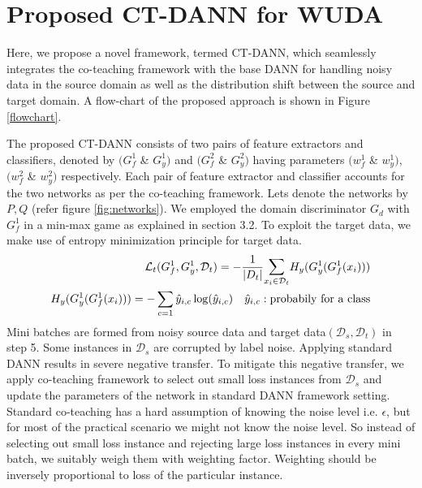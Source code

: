 
\section{Proposed CT-DANN for WUDA}
Here, we propose a novel framework, termed CT-DANN, which seamlessly integrates the co-teaching framework with the base DANN for handling noisy data in the source domain as well as the distribution shift between the source and target domain.
A flow-chart of the proposed approach is shown in Figure \ref{flowchart}.

\vspace{-1cm}

The proposed CT-DANN consists of two pairs of feature extractors and classifiers, denoted by $(G_{f}^1$ \& $G_{y}^1)$ and $(G_{f}^2$ \& $G_{y}^2)$ having parameters $(w_{f}^1$ \& $w_{y}^1)$, $(w_{f}^2$ \& $w_{y}^2)$ respectively. 
Each pair of feature extractor and classifier accounts for the two networks as per the co-teaching framework. Lets denote the networks by $P, Q$ (refer figure \ref{fig:networks}). We employed the domain discriminator $G_d$ with $G_{f}^1$ in a min-max game as explained in section 3.2. To exploit the target data, we make use of entropy minimization principle for target data.
\begin{equation}
\begin{align}
    \mathcal{L}_t(G_{f}^1, G_{y}^1, \mathcal{D}_t) = - \dfrac{1}{|D_t|} \mathlarger\sum\limits_{x_i \in \mathcal{D}_t} H_y(G_{y}^1(G_{f}^1(x_i)))\\
    H_y(G_{y}^1(G_{f}^1(x_i))) = - \sum_{c=1} \hat{y}_{i,c} \log(\hat{y}_{i,c}) \quad  \hat{y}_{i,c}: \text{probabily for a class}
\end{align}
\end{equation}
Mini batches are formed from noisy source data and target data$(\mathcal{D}_s, \mathcal{D}_t)$ in step 5. Some instances in $\mathcal{D}_s$ are corrupted by label noise. Applying standard DANN results in severe negative transfer. To mitigate this negative transfer, we apply co-teaching framework to select out small loss instances from $\mathcal{D}_s$ and update the parameters of the network in standard DANN framework setting.\\
Standard co-teaching has a hard assumption of knowing the noise level i.e. $\epsilon$, but for most of the practical scenario we might not know the noise level. So instead of selecting out small loss instance and rejecting large loss instances in every mini batch, we suitably weigh them with weighting factor. Weighting should be inversely proportional to loss of the particular instance.

